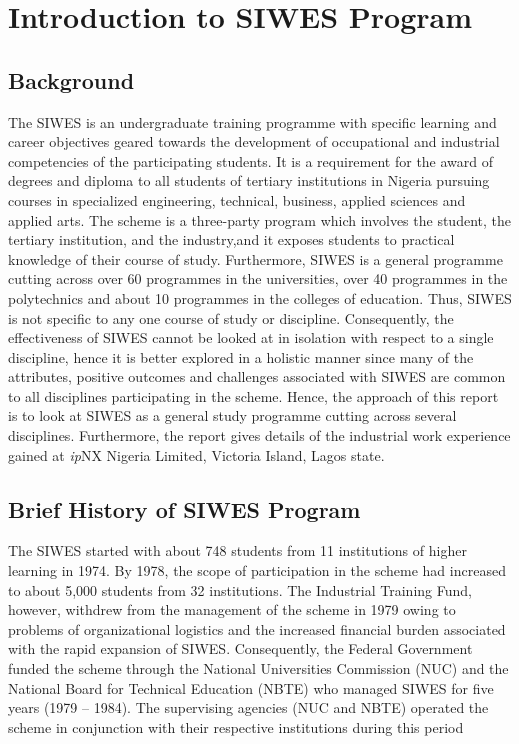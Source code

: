 \chapter{Introduction to SIWES Program}

\section{Background}


The \ac{SIWES} is an undergraduate training
programme with specific learning and career objectives geared towards the development of
occupational and industrial competencies of the participating students. It is a requirement for the
award of degrees and diploma to all students of tertiary institutions in Nigeria pursuing courses
in specialized engineering, technical, business, applied sciences and applied arts. The scheme is a
three-party program which involves the student, the tertiary institution, and the industry,and it exposes students to practical knowledge of their course of study.
Furthermore, SIWES is a general programme cutting across over 60 programmes in the
universities, over 40 programmes in the polytechnics and about 10 programmes in the colleges of
education. Thus, SIWES is not specific to any one course of study or discipline.
Consequently, the effectiveness of SIWES cannot be looked at in isolation with respect to a single
discipline, hence it is better explored in a holistic manner since many of the attributes, positive outcomes and challenges associated with SIWES are common to all disciplines participating in the scheme.
Hence, the approach of this report is to look at SIWES as a general study programme cutting across
several disciplines. Furthermore, the report gives details of the industrial work experience gained at \textit{ip}NX Nigeria Limited, Victoria Island, Lagos state.
\section{Brief History of SIWES Program}


The \ac{SIWES} started with about 748
students from 11 institutions of higher learning in 1974. By 1978, the scope of participation in the
scheme had increased to about 5,000 students from 32 institutions. The Industrial Training Fund,
however, withdrew from the management of the scheme in 1979 owing to problems of
organizational logistics and the increased financial burden associated with the rapid expansion of SIWES. Consequently, the Federal Government funded the scheme through the National Universities Commission (NUC) and the National Board for Technical Education (NBTE) who managed SIWES for five years (1979 – 1984). The supervising agencies (NUC and NBTE)
operated the scheme in conjunction with their respective institutions during this period
